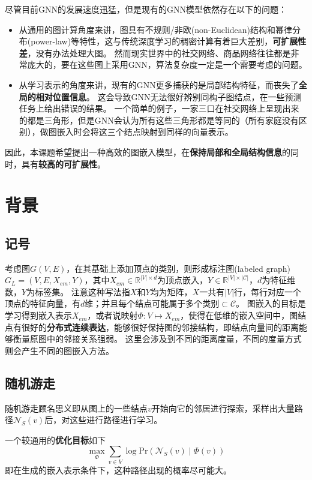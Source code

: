 \documentclass[reportComp]{thesis}
\begin{document}
尽管目前GNN的发展速度迅猛，但是现有的GNN模型依然存在以下的问题：
\begin{itemize}
\item 从通用的图计算角度来讲，图具有不规则/非欧(non-Euclidean)结构和幂律分布(power-law)等特性，这与传统深度学习的稠密计算有着巨大差别，\textbf{可扩展性差}，没有办法处理大图。
然而现实世界中的社交网络、商品网络往往都是非常庞大的，要在这些图上采用GNN，算法复杂度一定是一个需要考虑的问题。
\item 从学习表示的角度来讲，现有的GNN更多捕获的是局部结构特征，而丧失了\textbf{全局的相对位置信息}。
这会导致GNN无法很好辨别同构子图结点，在一些预测任务上给出错误的结果。
一个简单的例子，一家三口在社交网络上呈现出来的都是三角形，但是GNN会认为所有这些三角形都是等同的（所有家庭没有区别），做图嵌入时会将这三个结点映射到同样的向量表示。
\end{itemize}

因此，本课题希望提出一种高效的图嵌入模型，在\textbf{保持局部和全局结构信息}的同时，具有\textbf{较高的可扩展性}。

\section{背景}
\subsection{记号}
考虑图$G(V,E)$，在其基础上添加顶点的类别，则形成标注图(labeled graph)$G_L=(V,E,X_{em},Y)$，其中$X_{em}\in\mathbb{R}^{|V|\times d}$为顶点嵌入，$Y\in\mathbb{R}^{|V|\times |\mathcal{C}|}$，$d$为特征维数，$Y$为标签集。
注意这种写法指$X$和$Y$均为矩阵，$X$一共有$|V|$行，每行对应一个顶点的特征向量，有$d$维；并且每个结点可能属于多个类别$\subset \mathcal{C}$。
图嵌入的目标是学习得到嵌入表示$X_{em}$，或者说映射$\Phi:V\mapsto X_{em}$，使得在低维的嵌入空间中，图结点有很好的\textbf{分布式连续表达}，能够很好保持图的邻接结构，即结点向量间的距离能够衡量原图中的邻接关系强弱。
这里会涉及到不同的距离度量，不同的度量方式则会产生不同的图嵌入方法。

\subsection{随机游走}
随机游走顾名思义即从图上的一些结点$v$开始向它的邻居进行探索，采样出大量路径$\mathcal{N}_S(v)$后，对这些进行路径进行学习。

一个较通用的\textbf{优化目标}如下
\[\max_\Phi\sum_{v\in V}\log\mathrm{Pr}(\mathcal{N}_S(v)\mid \Phi(v))\]
即在生成的嵌入表示条件下，这种路径出现的概率尽可能大。
\end{document}
